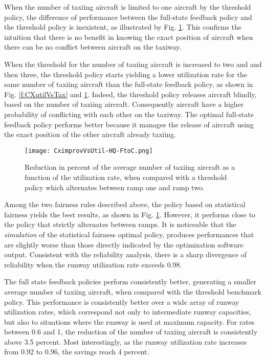 \documentclass[letterpaper]{article}
\begin{document}
When the number of taxiing aircraft is limited to one aircraft by the threshold policy, the difference of performance between the full-state
 feedback policy and the threshold policy is inexistent, as illustrated by Fig. \ref{f:CximprovVsUtil}. 
 This confirms the intuition that there is no benefit in knowing the exact  position of aircraft 
 when there can be no conflict between aircraft on the taxiway.

When the threshold for the number of taxiing aircraft is increased to two and and then three, 
the threshold policy starts yielding a lower utilization rate for the same number of taxiing aircraft than the full-state feedback policy, 
as shown in Fig. \ref{f:CXutilVsTax} and \ref{f:CximprovVsUtil}. Indeed, the threshold policy releases aircraft blindly, based on the number 
of taxiing aircraft. Consequently aircraft have a higher probability of conflicting with each other on the taxiway. 
The optimal full-state feedback policy performs better because it manages the release of aircraft using the exact position of the other aircraft already taxiing.

\begin{figure}[ht]
\hspace{-5mm}
\texttt{[image: CximprovVsUtil-HQ-FtoC.png]}
\caption{Reduction in percent of the average number of taxiing aircraft as a function of the utilization rate,
when compared with a threshold policy which alternates between ramp one and ramp two.}
\label{f:CximprovVsUtil}
\end{figure}

Among the two fairness rules described above, the policy based on statistical fairness yields the best results, 
as shown in Fig. \ref{f:CximprovVsUtil}. However, it performs close to the policy that strictly alternates between ramps. 
It is noticeable that the \emph{simulation} of the statistical fairness optimal policy, produces performances that are slightly
 worse than those directly indicated by the optimization software output. 
 Consistent with the reliability analysis, there is a sharp divergence of reliability when the runway utilization rate exceeds 0.98.

The full state feedback policies perform consistently better, generating a smaller average number of taxiing aircraft, 
when compared with the threshold benchmark policy. This performance is consistently better over a wide array of runway utilization rates,
 which correspond not only to intermediate runway capacities, but also to situations where the runway is used at maximum capacity. 
 For rates between 0.6 and 1, the reduction of the number of taxiing aircraft is consistently above 3.5 percent. 
 Most interestingly, as the runway utilization rate increases from 0.92 to 0.96, the savings reach 4 percent.
\end{document}
